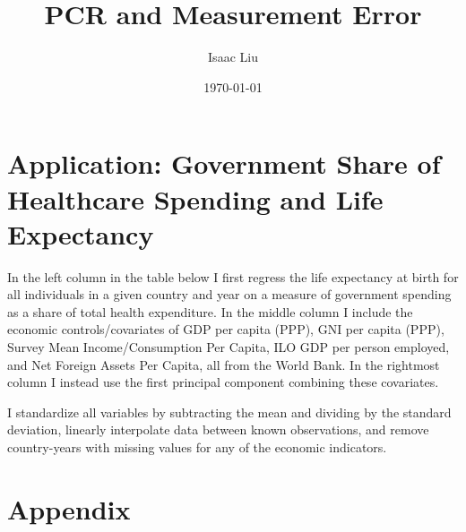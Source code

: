 \documentclass{report}
\title{PCR and Measurement Error}
\author{Isaac Liu}
\date{\today}
\begin{document}
	\maketitle

	\newpage \clearpage

    \section*{Application: Government Share of Healthcare Spending and Life Expectancy}

	In the left column in the table below I first regress the life expectancy at birth for all individuals in a given country and year on a measure of government spending as a share of total health expenditure. In the middle column I include the economic controls/covariates of GDP per capita (PPP), GNI per capita (PPP), Survey Mean Income/Consumption Per Capita, ILO GDP per person employed, and Net Foreign Assets Per Capita, all from the World Bank. In the rightmost column I instead use the first principal component combining these covariates.
	
	I standardize all variables by subtracting the mean and dividing by the standard deviation, linearly interpolate data between known observations, and remove country-years with missing values for any of the economic indicators.

    



	

    \clearpage \newpage

    \appendix

    \section*{Appendix}
\end{document}
